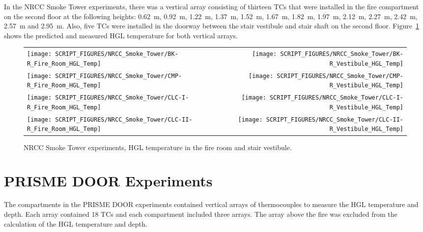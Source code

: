 In the NRCC Smoke Tower experiments, there was a vertical array consisting of thirteen TCs that were installed in the fire compartment on the second floor at the following heights: 0.62~m, 0.92~m, 1.22~m, 1.37~m, 1.52~m, 1.67~m, 1.82~m, 1.97~m, 2.12~m, 2.27~m, 2.42~m, 2.57~m and 2.95~m. Also, five TCs were installed in the doorway between the stair vestibule and stair shaft on the second floor. Figure~\ref{NRCC_Smoke_Tower_HGL_Temp} shows the predicted and measured HGL temperature for both vertical arrays.

\newpage

\begin{figure}[p]
\begin{tabular*}{\textwidth}{l@{\extracolsep{\fill}}r}
\texttt{[image: SCRIPT\_FIGURES/NRCC\_Smoke\_Tower/BK-R\_Fire\_Room\_HGL\_Temp]} &
\texttt{[image: SCRIPT\_FIGURES/NRCC\_Smoke\_Tower/BK-R\_Vestibule\_HGL\_Temp]} \\
\texttt{[image: SCRIPT\_FIGURES/NRCC\_Smoke\_Tower/CMP-R\_Fire\_Room\_HGL\_Temp]} &
\texttt{[image: SCRIPT\_FIGURES/NRCC\_Smoke\_Tower/CMP-R\_Vestibule\_HGL\_Temp]} \\
\texttt{[image: SCRIPT\_FIGURES/NRCC\_Smoke\_Tower/CLC-I-R\_Fire\_Room\_HGL\_Temp]} &
\texttt{[image: SCRIPT\_FIGURES/NRCC\_Smoke\_Tower/CLC-I-R\_Vestibule\_HGL\_Temp]} \\
\texttt{[image: SCRIPT\_FIGURES/NRCC\_Smoke\_Tower/CLC-II-R\_Fire\_Room\_HGL\_Temp]} &
\texttt{[image: SCRIPT\_FIGURES/NRCC\_Smoke\_Tower/CLC-II-R\_Vestibule\_HGL\_Temp]}
\end{tabular*}
\caption[NRCC Smoke Tower experiments, HGL temperature in the fire room and stair vestibule]
{NRCC Smoke Tower experiments, HGL temperature in the fire room and stair vestibule.}
\label{NRCC_Smoke_Tower_HGL_Temp}
\end{figure}


\clearpage

\section{PRISME DOOR Experiments}

The compartments in the PRISME DOOR experiments contained vertical arrays of thermocouples to measure the HGL temperature and depth. Each array contained 18 TCs and each compartment included three arrays. The array above the fire was excluded from the calculation of the HGL temperature and depth.


